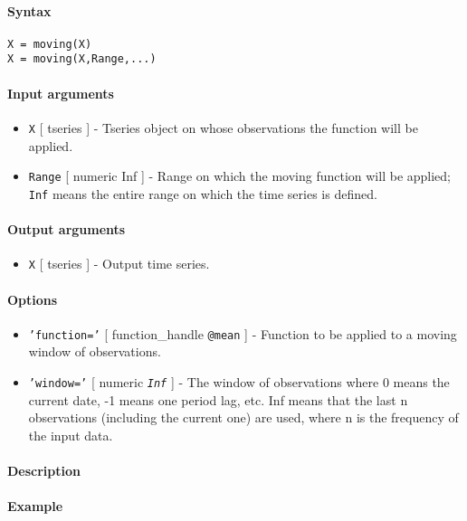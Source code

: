 


	\paragraph{Syntax}\label{syntax}

\begin{verbatim}
X = moving(X)
X = moving(X,Range,...)
\end{verbatim}

\paragraph{Input arguments}\label{input-arguments}

\begin{itemize}
\item
  \texttt{X} {[} tseries {]} - Tseries object on whose observations the
  function will be applied.
\item
  \texttt{Range} {[} numeric \textbar{} Inf {]} - Range on which the
  moving function will be applied; \texttt{Inf} means the entire range
  on which the time series is defined.
\end{itemize}

\paragraph{Output arguments}\label{output-arguments}

\begin{itemize}
\itemsep1pt\parskip0pt
\item
  \texttt{X} {[} tseries {]} - Output time series.
\end{itemize}

\paragraph{Options}\label{options}

\begin{itemize}
\item
  \texttt{'function='} {[} function\_handle \textbar{} \texttt{@mean}
  {]} - Function to be applied to a moving window of observations.
\item
  \texttt{'window='} {[} numeric \textbar{} \emph{\texttt{Inf}} {]} -
  The window of observations where 0 means the current date, -1 means
  one period lag, etc. Inf means that the last n observations (including
  the current one) are used, where n is the frequency of the input data.
\end{itemize}

\paragraph{Description}\label{description}

\paragraph{Example}\label{example}


